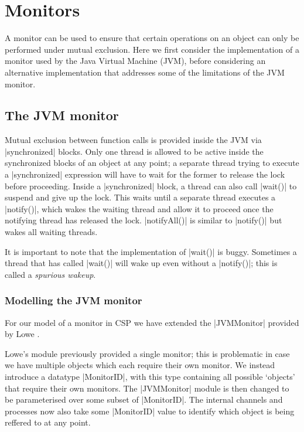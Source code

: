 \inlineCSP
\section{Monitors}

A monitor can be used to ensure that certain operations on an object can only be performed under mutual exclusion. Here we first consider the implementation of a monitor used by the Java Virtual Machine (JVM), before considering an alternative implementation that addresses some of the limitations of the JVM monitor.

\subsection{The JVM monitor}

Mutual exclusion between function calls is provided inside the JVM via |synchronized| blocks. Only one thread is allowed to be active inside the synchronized blocks of an object at any point; a separate thread trying to execute a |synchronized| expression will have to wait for the former to release the lock before proceeding. Inside a |synchronized| block, a thread can also call |wait()| to suspend and give up the lock. This waits until a separate thread executes a |notify()|, which wakes the waiting thread and allow it to proceed once the notifying thread has released the lock. |notifyAll()| is similar to |notify()| but wakes all waiting threads.

It is important to note that the implementation of |wait()| is buggy. Sometimes a thread that has called |wait()| will wake up even without a |notify()|; this is called a \emph{spurious wakeup}.




\subsubsection{Modelling the JVM monitor}

\inlineCSP

For our model of a monitor in CSP we have extended the |JVMMonitor| provided by Lowe \cite{LoweJVMMonitor}.

Lowe's module previously provided a single monitor; this is problematic in case we have multiple objects which each require their own monitor. We instead introduce a datatype |MonitorID|, with this type containing all possible `objects' that require their own monitors. The |JVMMonitor| module is then changed to be parameterised over some subset of |MonitorID|. The internal channels and processes now also take some |MonitorID| value to identify which object is being reffered to at any point.

